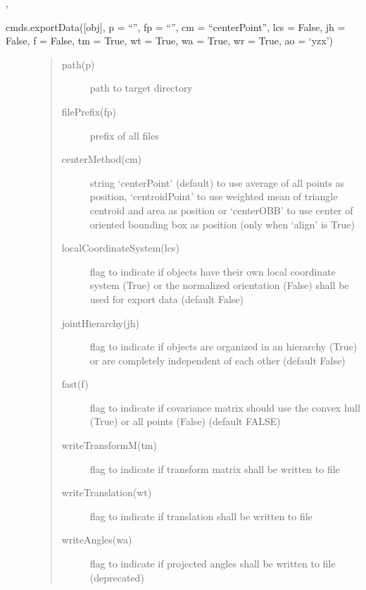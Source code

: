 \documentclass[letterpaper,10pt,english]{sphinxmanual}
\begin{document}
 {\hyperref[\detokenize{pk_src.normalize:normalize}]{}}, {\hyperref[\detokenize{pk_src.coordinateSystem:coordinatesystem}]{}}

 cmds.exportData({[}obj{]}, p = “”, fp = “”, cm = “centerPoint”, lcs = False, jh = False, f = False, tm = True, wt = True, wa = True, wr = True, ao = ‘yzx’)
\begin{description}
\item[{}] \leavevmode\begin{quote}\begin{description}
\item[{path(p)}] \leavevmode
path to target directory

\item[{filePrefix(fp)}] \leavevmode
prefix of all files

\item[{centerMethod(cm)}] \leavevmode
string ‘centerPoint’ (default) to use average of all points as position, ‘centroidPoint’ to use weighted mean of triangle centroid and area as position or ‘centerOBB’ to use center of oriented bounding box as position (only when ‘align’ is True)

\item[{localCoordinateSystem(lcs)}] \leavevmode
flag to indicate if objects have their own local coordinate system (True) or the normalized orientation (False) shall be used for export data (default False)

\item[{jointHierarchy(jh)}] \leavevmode
flag to indicate if objects are organized in an hierarchy (True) or are completely independent of each other (default False)

\item[{fast(f)}] \leavevmode
flag to indicate if covariance matrix should use the convex hull (True) or all points (False) (default FALSE)

\item[{writeTransformM(tm)}] \leavevmode
flag to indicate if transform matrix shall be written to file

\item[{writeTranslation(wt)}] \leavevmode
flag to indicate if translation shall be written to file

\item[{writeAngles(wa)}] \leavevmode
flag to indicate if projected angles shall be written to file (deprecated)


\end{description}
\end{quote}
\end{description}
\end{document}

